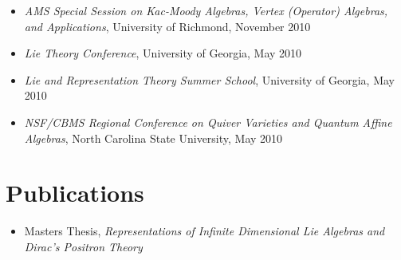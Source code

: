 \documentclass[10pt]{article}
\begin{document}
\begin{itemize}

\item	{\it AMS Special Session on Kac-Moody Algebras, Vertex (Operator)
Algebras, and Applications}, University of Richmond, November 2010

\item	{\it Lie Theory Conference}, University of Georgia, May 2010

\item	{\it Lie and Representation Theory Summer School}, University of Georgia,
May 2010

\item	{\it NSF/CBMS Regional Conference on Quiver Varieties and Quantum Affine
Algebras}, North Carolina State University, May 2010

\end{itemize}


\section*{Publications}

\begin{itemize}

\item Masters Thesis, {\it Representations of Infinite Dimensional Lie Algebras
and Dirac's Positron Theory}

\end{itemize}
\end{document}
